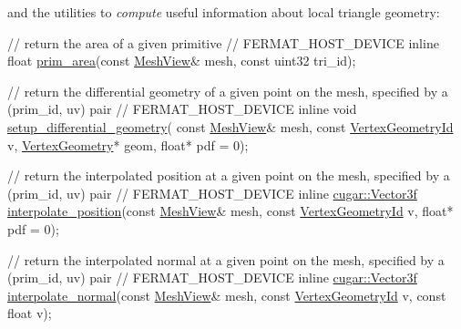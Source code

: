 \begin{DoxyParagraph}{}
and the utilities to {\itshape compute} useful information about local triangle geometry\+: ~\newline

\begin{DoxyCode}
\textcolor{comment}{// return the area of a given primitive}
\textcolor{comment}{//}
FERMAT\_HOST\_DEVICE \textcolor{keyword}{inline}
\textcolor{keywordtype}{float} \hyperlink{group___mesh_module_ga516a7610fe394a18d5083aa21f6cda75}{prim\_area}(\textcolor{keyword}{const} \hyperlink{struct_mesh_view}{MeshView}& mesh, \textcolor{keyword}{const} uint32 tri\_id);

\textcolor{comment}{// return the differential geometry of a given point on the mesh, specified by a (prim\_id, uv) pair}
\textcolor{comment}{//}
FERMAT\_HOST\_DEVICE \textcolor{keyword}{inline}
\textcolor{keywordtype}{void} \hyperlink{group___mesh_module_ga4fa88a02d11b01ea12e6a602b3e3e5c2}{setup\_differential\_geometry}(
       \textcolor{keyword}{const} \hyperlink{struct_mesh_view}{MeshView}&         mesh,
       \textcolor{keyword}{const} \hyperlink{struct_vertex_geometry_id}{VertexGeometryId}  v,
       \hyperlink{struct_vertex_geometry}{VertexGeometry}*         geom,
       \textcolor{keywordtype}{float}*                  pdf = 0);

\textcolor{comment}{// return the interpolated position at a given point on the mesh, specified by a (prim\_id, uv) pair}
\textcolor{comment}{//}
FERMAT\_HOST\_DEVICE \textcolor{keyword}{inline}
\hyperlink{structcugar_1_1_vector}{cugar::Vector3f} \hyperlink{group___mesh_module_ga9eea5d10bfff40b7f050910a97212189}{interpolate\_position}(\textcolor{keyword}{const} 
      \hyperlink{struct_mesh_view}{MeshView}& mesh, \textcolor{keyword}{const} \hyperlink{struct_vertex_geometry_id}{VertexGeometryId} v, \textcolor{keywordtype}{float}* pdf = 0);

\textcolor{comment}{// return the interpolated normal at a given point on the mesh, specified by a (prim\_id, uv) pair}
\textcolor{comment}{//}
FERMAT\_HOST\_DEVICE \textcolor{keyword}{inline}
\hyperlink{structcugar_1_1_vector}{cugar::Vector3f} \hyperlink{group___mesh_module_gac16c0ec581833a6cf3f821d0edeb698b}{interpolate\_normal}(\textcolor{keyword}{const} 
      \hyperlink{struct_mesh_view}{MeshView}& mesh, \textcolor{keyword}{const} \hyperlink{struct_vertex_geometry_id}{VertexGeometryId} v, \textcolor{keyword}{const} \textcolor{keywordtype}{float} v);
\end{DoxyCode}
 
\end{DoxyParagraph}
